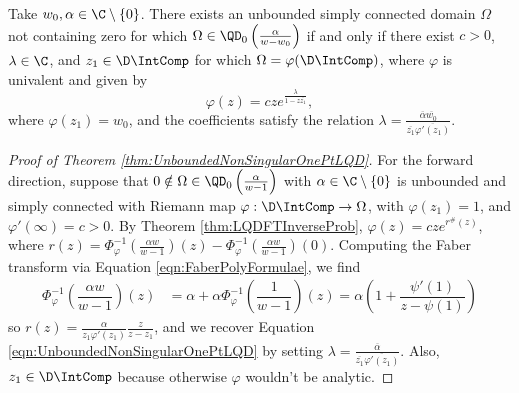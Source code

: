 \documentclass{article}
\numberwithin{equation}{section}
\begin{document}
\begin{theorem}\label{thm:UnboundedNonSingularOnePtLQD}
Take $w_0,\alpha\in\C\setminus\{0\}$. There exists an unbounded simply connected domain $\Omega$ not containing zero for which $\Omega\in\QD_0\left(\frac{\alpha}{w-w_0}\right)$ if and only if there exist $c>0$, $\lambda\in\C$, and $z_1\in\D\IntComp$ for which $\Omega=\varphi(\D\IntComp)$, where $\varphi$ is univalent and given by
\begin{equation}\label{eqn:UnboundedNonSingularOnePtLQD}
    \varphi(z)=cze^{\frac{\lambda}{1-z\overline{z_1}}},
\end{equation}
where $\varphi(z_1)=w_0$, and the coefficients satisfy the relation $\lambda=\frac{\overline{\alpha}\overline{w_0}}{\overline{z_1}\overline{\varphi'(z_1)}}$.
\end{theorem}
\begin{proof}[Proof of Theorem \ref{thm:UnboundedNonSingularOnePtLQD}]\label{proof:UnboundedNonSingularOnePtLQD}
For the forward direction, suppose that $0\notin\Omega\in\QD_0\left(\frac{\alpha}{w-1}\right)$ with $\alpha\in\C\setminus\{0\}$ is unbounded and simply connected with Riemann map $\varphi:\D\IntComp\rightarrow\Omega$, with $\varphi(z_1)=1$, and $\varphi'(\infty)=c>0$. By Theorem \ref{thm:LQDFTInverseProb}, $\varphi(z)=cze^{r^{\#}(z)}$, where $r(z)=\Phi_{\varphi}^{-1}\left(\frac{\alpha w}{w-1}\right)(z)-\Phi_{\varphi}^{-1}\left(\frac{\alpha w}{w-1}\right)(0)$. Computing the Faber transform via Equation \ref{eqn:FaberPolyFormulae}, we find
\begin{align*}
    \Phi_{\varphi}^{-1}\left(\dfrac{\alpha w}{w-1}\right)(z)&=\alpha+\alpha\Phi_{\varphi}^{-1}\left(\dfrac{1}{w-1}\right)(z)=\alpha\left(1+\dfrac{\psi'(1)}{z-\psi(1)}\right)
\end{align*}
so $r(z)=\frac{\alpha}{z_1\varphi'(z_1)}\frac{z}{z-z_1}$, and we recover Equation \ref{eqn:UnboundedNonSingularOnePtLQD} by setting $\lambda=\frac{\overline{\alpha}}{\overline{z_1}\overline{\varphi'(z_1)}}$. Also, $z_1\in\D\IntComp$ because otherwise $\varphi$ wouldn't be analytic.


\end{proof}
\end{document}
